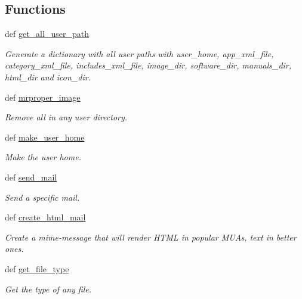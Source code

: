 \subsection*{Functions}
\begin{CompactItemize}
\item 
def \hyperlink{namespaceweb__winsol_348f54eacdfbf5e3a5577ce3c166ab36}{get\_\-all\_\-user\_\-path}
\begin{CompactList}\small\item\em Generate a dictionary with all user paths with {\em user\_\-home\/}, {\em app\_\-xml\_\-file\/}, {\em category\_\-xml\_\-file\/}, {\em includes\_\-xml\_\-file\/}, {\em image\_\-dir\/}, {\em software\_\-dir\/}, {\em manuals\_\-dir\/}, {\em html\_\-dir\/} and {\em icon\_\-dir\/}. \item\end{CompactList}\item 
def \hyperlink{namespaceweb__winsol_0156c53f75f815966c2bff40b2de7ff6}{mrproper\_\-image}
\begin{CompactList}\small\item\em Remove all in any user directory. \item\end{CompactList}\item 
def \hyperlink{namespaceweb__winsol_2913e719d536aeaaf2cf8314393b008c}{make\_\-user\_\-home}
\begin{CompactList}\small\item\em Make the user home. \item\end{CompactList}\item 
def \hyperlink{namespaceweb__winsol_76afedd334ceb5eafc031bf8013780ca}{send\_\-mail}
\begin{CompactList}\small\item\em Send a specific mail. \item\end{CompactList}\item 
def \hyperlink{namespaceweb__winsol_cf881f7f7b6f8ac666b967b58521ae14}{create\_\-html\_\-mail}
\begin{CompactList}\small\item\em Create a mime-message that will render HTML in popular MUAs, text in better ones. \item\end{CompactList}\item 
def \hyperlink{namespaceweb__winsol_5ace888d1ca8424d97ab5ae07e44dab3}{get\_\-file\_\-type}
\begin{CompactList}\small\item\em Get the type of any file. \item\end{CompactList}\end{CompactItemize}
